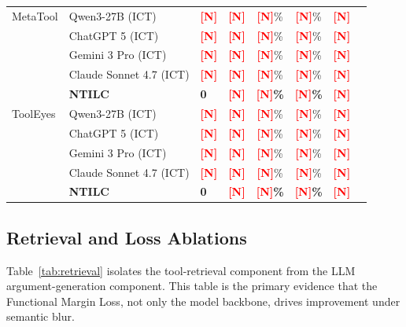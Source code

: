 \documentclass{article}
\newcommand{\placeholder}[1]{\textcolor{red}{\textbf{[#1]}}}
\begin{document}
\begin{table}[H]
\begin{tabular}{lllccccc}
\midrule
MetaTool & Qwen3-27B (ICT) & \placeholder{N} & \placeholder{N} & \placeholder{N}\% & \placeholder{N}\% & \placeholder{N} \\
 & ChatGPT 5 (ICT) & \placeholder{N} & \placeholder{N} & \placeholder{N}\% & \placeholder{N}\% & \placeholder{N} \\
 & Gemini 3 Pro (ICT) & \placeholder{N} & \placeholder{N} & \placeholder{N}\% & \placeholder{N}\% & \placeholder{N} \\
 & Claude Sonnet 4.7 (ICT) & \placeholder{N} & \placeholder{N} & \placeholder{N}\% & \placeholder{N}\% & \placeholder{N} \\
 & \textbf{NTILC} & \textbf{0} & \textbf{\placeholder{N}} & \textbf{\placeholder{N}\%} & \textbf{\placeholder{N}\%} & \textbf{\placeholder{N}} \\
\midrule
ToolEyes & Qwen3-27B (ICT) & \placeholder{N} & \placeholder{N} & \placeholder{N}\% & \placeholder{N}\% & \placeholder{N} \\
 & ChatGPT 5 (ICT) & \placeholder{N} & \placeholder{N} & \placeholder{N}\% & \placeholder{N}\% & \placeholder{N} \\
 & Gemini 3 Pro (ICT) & \placeholder{N} & \placeholder{N} & \placeholder{N}\% & \placeholder{N}\% & \placeholder{N} \\
 & Claude Sonnet 4.7 (ICT) & \placeholder{N} & \placeholder{N} & \placeholder{N}\% & \placeholder{N}\% & \placeholder{N} \\
 & \textbf{NTILC} & \textbf{0} & \textbf{\placeholder{N}} & \textbf{\placeholder{N}\%} & \textbf{\placeholder{N}\%} & \textbf{\placeholder{N}} \\
\bottomrule
\end{tabular}
\end{table}

\subsection{Retrieval and Loss Ablations}
\label{sec:ablation}

Table~\ref{tab:retrieval} isolates the tool-retrieval component from the LLM argument-generation component.
This table is the primary evidence that the Functional Margin Loss, not only the model backbone, drives improvement under semantic blur.
\end{document}
